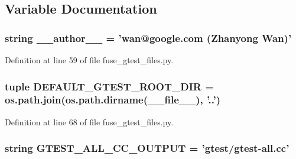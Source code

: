 \subsection{\-Variable \-Documentation}
\hypertarget{namespacefuse__gtest__files_a629d61dfe4da763164a4d1a2d85b0afd}{
\subsubsection[{\-\_\-\-\_\-author\-\_\-\-\_\-}]{\setlength{\rightskip}{0pt plus 5cm}string {\bf \-\_\-\-\_\-author\-\_\-\-\_\-} = 'wan@google.\-com (\-Zhanyong \-Wan)'}}\label{d3/dfa/namespacefuse__gtest__files_a629d61dfe4da763164a4d1a2d85b0afd}


\-Definition at line 59 of file fuse\-\_\-gtest\-\_\-files.\-py.

\hypertarget{namespacefuse__gtest__files_a2325a613003d4d89aecad84735edb4dc}{
\subsubsection[{\-D\-E\-F\-A\-U\-L\-T\-\_\-\-G\-T\-E\-S\-T\-\_\-\-R\-O\-O\-T\-\_\-\-D\-I\-R}]{\setlength{\rightskip}{0pt plus 5cm}tuple {\bf \-D\-E\-F\-A\-U\-L\-T\-\_\-\-G\-T\-E\-S\-T\-\_\-\-R\-O\-O\-T\-\_\-\-D\-I\-R} = os.\-path.\-join(os.\-path.\-dirname(\-\_\-\-\_\-file\-\_\-\-\_\-), '..')}}\label{d3/dfa/namespacefuse__gtest__files_a2325a613003d4d89aecad84735edb4dc}


\-Definition at line 68 of file fuse\-\_\-gtest\-\_\-files.\-py.

\hypertarget{namespacefuse__gtest__files_a67d0dc122f66b2cab15c4edeb7243fed}{
\subsubsection[{\-G\-T\-E\-S\-T\-\_\-\-A\-L\-L\-\_\-\-C\-C\-\_\-\-O\-U\-T\-P\-U\-T}]{\setlength{\rightskip}{0pt plus 5cm}string {\bf \-G\-T\-E\-S\-T\-\_\-\-A\-L\-L\-\_\-\-C\-C\-\_\-\-O\-U\-T\-P\-U\-T} = 'gtest/gtest-\/all.\-cc'}}\label{d3/dfa/namespacefuse__gtest__files_a67d0dc122f66b2cab15c4edeb7243fed}


